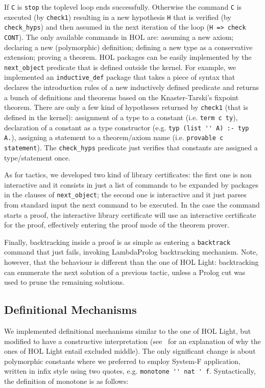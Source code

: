 \documentclass[preprint]{sigplanconf}
\begin{document}
If \verb+C+ is \verb+stop+ the toplevel loop ends successfully. Otherwise the command \verb+C+ is executed (by \verb+check1+) resulting in a new hypothesis \verb+H+ that is verified (by \verb+check_hyps+) and then assumed in the next iteration of the loop (\verb+H => check CONT+). The only available commands in HOL are: assuming a new axiom; declaring a new (polymorphic) definition; defining a new type as a conservative extension; proving a theorem. HOL packages can be easily implemented by the \verb+next_object+ predicate that is defined outside the kernel. For example, we implemented an \verb+inductive_def+ package that takes a piece of syntax that declares the introduction rules of a new inductively defined predicate and returns a bunch of definitions and theorems based on the Knaster-Tarski's fixpoint theorem. There are only a few kind of hypotheses returned by \verb+check1+ (that is defined in the kernel): assignment of a type to a constant (i.e. \verb+term c ty+), declaration of a constant as a type constructor (e.g. \verb+typ (list '' A) :- typ A.+), assigning a statement to a theorem/axiom name (i.e. \verb+provable c statement+). The \verb+check_hyps+ predicate just verifies that constants are assigned a type/statement once.

As for tactics, we developed two kind of library certificates: the first one is non interactive and it consists in just a list of commands to be expanded by packages in the clauses of \verb+next_object+; the second one is interactive and it just parses from standard input the next command to be executed. In the case the command starts a proof, the interactive library certificate will use an interactive certificate for the proof, effectively entering the proof mode of the theorem prover.

Finally, backtracking inside a proof is as simple as entering a \verb+backtrack+ command that just fails, invoking LambdaProlog backtracking mechanism. Note, however, that the behaviour is different than the one of HOL Light: backtracking can enumerate the next solution of a previous tactic, unless a Prolog cut was used to prune the remaining solutions.

\subsection{Definitional Mechanisms}

We implemented definitional mechanisms similar to the one of HOL Light, but modified to have a constructive interpretation (see~\cite{??} for an explanation of why the ones of HOL Light entail excluded middle). The only significant change is about polymorphic constants where we preferred to employ System-F application, written in infix style using two quotes, e.g. \verb+monotone '' nat ' f+. Syntactically, the definition of monotone is as follows:
\end{document}
